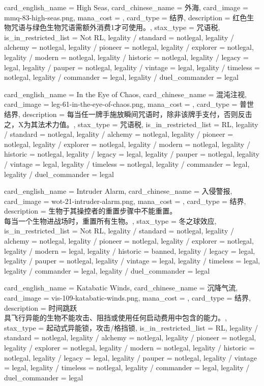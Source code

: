 \documentclass[lang = cn, color = black, 10pt]{AllThatStax}
\begin{document}
\card
{
	card_english_name = {High Seas},
	card_chinese_name = {外海},
	card_image = mmq-83-high-seas.png,
	mana_cost = ,
	card_type = 结界,
	description = {红色生物咒语与绿色生物咒语需额外消费1才可使用。},
	stax_type = 咒语税,
	is_in_restricted_list = Not RL,
	legality / standard = notlegal,
	legality / alchemy = notlegal,
	legality / pioneer = notlegal,
	legality / explorer = notlegal,
	legality / modern = notlegal,
	legality / historic = notlegal,
	legality / legacy = legal,
	legality / pauper = notlegal,
	legality / vintage = legal,
	legality / timeless = notlegal,
	legality / commander = legal,
	legality / duel_commander = legal
}

\card
{
	card_english_name = {In the Eye of Chaos},
	card_chinese_name = {混沌注视},
	card_image = leg-61-in-the-eye-of-chaos.png,
	mana_cost = ,
	card_type = 普世结界,
	description = {每当任一牌手施放瞬间咒语时，除非该牌手支付，否则反击之，X为其法术力值。},
	stax_type = 咒语税,
	is_in_restricted_list = RL,
	legality / standard = notlegal,
	legality / alchemy = notlegal,
	legality / pioneer = notlegal,
	legality / explorer = notlegal,
	legality / modern = notlegal,
	legality / historic = notlegal,
	legality / legacy = legal,
	legality / pauper = notlegal,
	legality / vintage = legal,
	legality / timeless = notlegal,
	legality / commander = legal,
	legality / duel_commander = legal
}

\card
{
	card_english_name = {Intruder Alarm},
	card_chinese_name = {入侵警报},
	card_image = wot-21-intruder-alarm.png,
	mana_cost = ,
	card_type = 结界,
	description = {生物于其操控者的重置步骤中不能重置。\\
每当一个生物进战场时，重置所有生物。},
	stax_type = 冬之球效应,
	is_in_restricted_list = Not RL,
	legality / standard = notlegal,
	legality / alchemy = notlegal,
	legality / pioneer = notlegal,
	legality / explorer = notlegal,
	legality / modern = legal,
	legality / historic = banned,
	legality / legacy = legal,
	legality / pauper = notlegal,
	legality / vintage = legal,
	legality / timeless = legal,
	legality / commander = legal,
	legality / duel_commander = legal
}

\card
{
	card_english_name = {Katabatic Winds},
	card_chinese_name = {沉降气流},
	card_image = vis-109-katabatic-winds.png,
	mana_cost = ,
	card_type = 结界,
	description = {时间跳跃\\
具飞行异能的生物不能攻击、阻挡或使用任何启动费用中包含的能力。},
	stax_type = 起动式异能锁，攻击/格挡锁,
	is_in_restricted_list = RL,
	legality / standard = notlegal,
	legality / alchemy = notlegal,
	legality / pioneer = notlegal,
	legality / explorer = notlegal,
	legality / modern = notlegal,
	legality / historic = notlegal,
	legality / legacy = legal,
	legality / pauper = notlegal,
	legality / vintage = legal,
	legality / timeless = notlegal,
	legality / commander = legal,
	legality / duel_commander = legal
}
\end{document}
